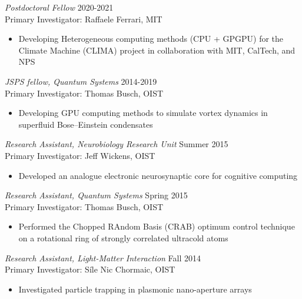 \documentclass[margin, 10pt, a4paper]{res} %
\begin{document}
\begin{resume}
{\sl Postdoctoral Fellow} \hfill 2020-2021 \\
Primary Investigator: Raffaele Ferrari, MIT

\begin{itemize}[label = {}] \itemsep -2pt %
\item Developing Heterogeneous computing methods (CPU + GPGPU) for the Climate Machine (CLIMA) project in collaboration with MIT, CalTech, and NPS
\end{itemize}

{\sl JSPS fellow, Quantum Systems} \hfill 2014-2019 \\
Primary Investigator: Thomas Busch, OIST

\begin{itemize}[label = {}] \itemsep -2pt %
\item Developing GPU computing methods to simulate vortex dynamics in superfluid Bose--Einstein condensates
\end{itemize}

{\sl Research Assistant, Neurobiology Research Unit} \hfill Summer 2015 \\
Primary Investigator: Jeff Wickens, OIST

\begin{itemize}[label = {}] \itemsep -2pt %
\item Developed an analogue electronic neurosynaptic core for cognitive computing
\end{itemize}

{\sl Research Assistant, Quantum Systems} \hfill Spring 2015 \\
Primary Investigator: Thomas Busch, OIST

\begin{itemize}[label = {}] \itemsep -2pt %
\item Performed the Chopped RAndom Basis (CRAB) optimum control technique on a rotational ring of strongly correlated ultracold atoms
\end{itemize}

{\sl Research Assistant, Light-Matter Interaction} \hfill Fall 2014 \\
Primary Investigator: S\'ile Nic Chormaic, OIST

\begin{itemize}[label = {}] \itemsep -2pt %
\item Investigated particle trapping in plasmonic nano-aperture arrays
\end{itemize}


\end{resume}
\end{document}
